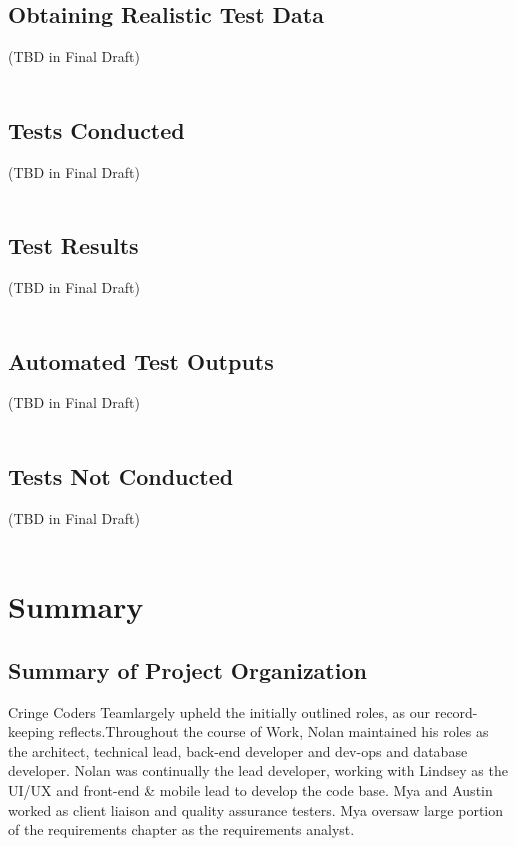 \documentclass[oneside,openany,obeyspaces]{book}
\newcommand\tab[1][1cm]{\hspace*{#1}}
\newcommand\TeamName{Cringe Coders Team}
\begin{document}
\begin{flushleft}
    \section{Obtaining Realistic Test Data}

    \tab (TBD in Final Draft)\\~\\


    \section{Tests Conducted}

    \tab (TBD in Final Draft)\\~\\


    \section{Test Results}

    \tab (TBD in Final Draft)\\~\\


    \section{Automated Test Outputs}

    \tab (TBD in Final Draft)\\~\\


    \section{Tests Not Conducted}

    \tab (TBD in Final Draft)\\~\\





    \chapter{Summary}

    \section{Summary of Project Organization}

    \tab \TeamName largely upheld the initially outlined roles, as our record-keeping reflects.Throughout the course of Work, Nolan maintained his roles as  the architect, technical lead, back-end developer and dev-ops and database developer. Nolan was continually the lead developer, working with Lindsey as the UI/UX and front-end \& mobile lead to develop the code base. Mya and Austin worked as client liaison and quality assurance testers. Mya oversaw large portion of the requirements chapter as the requirements analyst.\\~\\


\end{flushleft}
\end{document}
